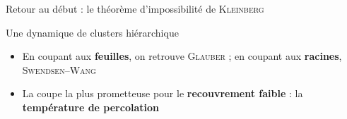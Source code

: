 \begin{frame}[t]{Retour au début : le théorème d'impossibilité de \textsc{Kleinberg}}
    \KleinbergCorps

    \vspace{0.34cm}
    \begin{center}
    \end{center}
\end{frame}

\begin{frame}{Une dynamique de clusters \textcolor{inria-rouge}{hiérarchique}}
    \vspace{0.02cm}
    \begin{center}
    \end{center}

    \vspace{0.06cm}
    \begin{center}
        \resizebox{0.54\textwidth}{!}{}
    \end{center}

    \vspace{0.08cm}
    \small
    \begin{itemize}
        \setlength{\itemsep}{5pt}
        \item En coupant aux \textbf{feuilles}, on retrouve \textsc{Glauber} ; en coupant aux
        \textbf{racines}, \textsc{Swendsen}--\textsc{Wang}
        \item La coupe la plus prometteuse pour le \textbf{recouvrement faible} :
        la \textbf{température de percolation} 
    \end{itemize}
\end{frame}

